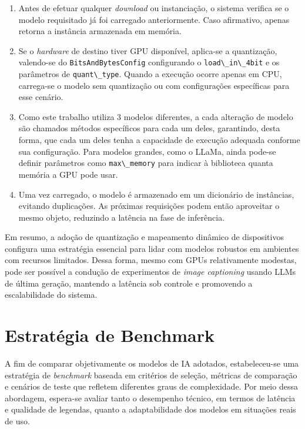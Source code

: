 \begin{enumerate}
    \item Antes de efetuar qualquer \textit{download} ou instanciação, o sistema verifica se o modelo requisitado já foi carregado anteriormente. Caso afirmativo, apenas retorna a instância armazenada em memória.
    \item Se o \textit{hardware} de destino tiver GPU disponível, aplica-se a quantização, valendo-se do \lstinline{BitsAndBytesConfig} configurando o \lstinline{load\_in\_4bit} e os parâmetros de \lstinline{quant\_type}. Quando a execução ocorre apenas em CPU, carrega-se o modelo sem quantização ou com configurações específicas para esse cenário.
    \item Como este trabalho utiliza 3 modelos diferentes, a cada alteração de modelo são chamados métodos específicos para cada um deles, garantindo, desta forma, que cada um deles tenha a capacidade de execução adequada conforme sua configuração. Para modelos grandes, como o LLaMa, ainda pode-se definir parâmetros como \lstinline{max\_memory} para indicar à biblioteca quanta memória a GPU pode usar.
    \item Uma vez carregado, o modelo é armazenado em um dicionário de instâncias, evitando duplicações. As próximas requisições podem então aproveitar o mesmo objeto, reduzindo a latência na fase de inferência.
\end{enumerate}

Em resumo, a adoção de quantização e mapeamento dinâmico de dispositivos configura uma estratégia essencial para lidar com modelos robustos em ambientes com recursos limitados. Dessa forma, mesmo com GPUs relativamente modestas, pode ser possível a condução de experimentos de \textit{image captioning} usando LLMs de última geração, mantendo a latência sob controle e promovendo a escalabilidade do sistema.

\section{Estratégia de Benchmark}

A fim de comparar objetivamente os modelos de IA adotados, estabeleceu-se uma estratégia de \textit{benchmark} baseada em critérios de seleção, métricas de comparação e cenários de teste que refletem diferentes graus de complexidade. Por meio dessa abordagem, espera-se avaliar tanto o desempenho técnico, em termos de latência e qualidade de legendas, quanto a adaptabilidade dos modelos em situações reais de uso.

